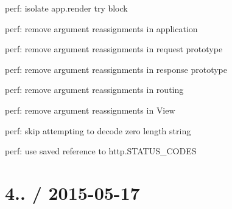 \begin{DoxyItemize}
\item {\ttfamily perf\+: isolate {\ttfamily app.\+render} try block}
\item {\ttfamily perf\+: remove argument reassignments in application}
\item {\ttfamily perf\+: remove argument reassignments in request prototype}
\item {\ttfamily perf\+: remove argument reassignments in response prototype}
\item {\ttfamily perf\+: remove argument reassignments in routing}
\item {\ttfamily perf\+: remove argument reassignments in {\ttfamily View}}
\item {\ttfamily perf\+: skip attempting to decode zero length string}
\item {\ttfamily perf\+: use saved reference to {\ttfamily http.\+S\+T\+A\+T\+U\+S\+\_\+\+C\+O\+D\+ES}}
\end{DoxyItemize}

{\ttfamily \section*{4.. / 2015-\/05-\/17 }}

{\ttfamily }

